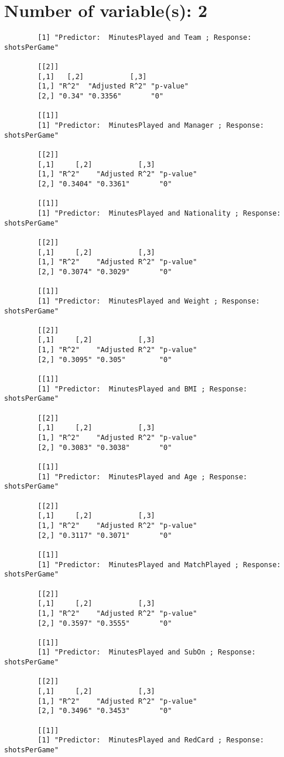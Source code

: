 \documentclass[12pt]{article}
\begin{document}
	\section{Number of variable(s): 2}
	\begin{verbatim}
		[1] "Predictor:  MinutesPlayed and Team ; Response:  shotsPerGame"
		
		[[2]]
		[,1]   [,2]           [,3]     
		[1,] "R^2"  "Adjusted R^2" "p-value"
		[2,] "0.34" "0.3356"       "0"      
		
		[[1]]
		[1] "Predictor:  MinutesPlayed and Manager ; Response:  shotsPerGame"
		
		[[2]]
		[,1]     [,2]           [,3]     
		[1,] "R^2"    "Adjusted R^2" "p-value"
		[2,] "0.3404" "0.3361"       "0"      
		
		[[1]]
		[1] "Predictor:  MinutesPlayed and Nationality ; Response:  shotsPerGame"
		
		[[2]]
		[,1]     [,2]           [,3]     
		[1,] "R^2"    "Adjusted R^2" "p-value"
		[2,] "0.3074" "0.3029"       "0"      
		
		[[1]]
		[1] "Predictor:  MinutesPlayed and Weight ; Response:  shotsPerGame"
		
		[[2]]
		[,1]     [,2]           [,3]     
		[1,] "R^2"    "Adjusted R^2" "p-value"
		[2,] "0.3095" "0.305"        "0"      
		
		[[1]]
		[1] "Predictor:  MinutesPlayed and BMI ; Response:  shotsPerGame"
		
		[[2]]
		[,1]     [,2]           [,3]     
		[1,] "R^2"    "Adjusted R^2" "p-value"
		[2,] "0.3083" "0.3038"       "0"      
		
		[[1]]
		[1] "Predictor:  MinutesPlayed and Age ; Response:  shotsPerGame"
		
		[[2]]
		[,1]     [,2]           [,3]     
		[1,] "R^2"    "Adjusted R^2" "p-value"
		[2,] "0.3117" "0.3071"       "0"      
		
		[[1]]
		[1] "Predictor:  MinutesPlayed and MatchPlayed ; Response:  shotsPerGame"
		
		[[2]]
		[,1]     [,2]           [,3]     
		[1,] "R^2"    "Adjusted R^2" "p-value"
		[2,] "0.3597" "0.3555"       "0"      
		
		[[1]]
		[1] "Predictor:  MinutesPlayed and SubOn ; Response:  shotsPerGame"
		
		[[2]]
		[,1]     [,2]           [,3]     
		[1,] "R^2"    "Adjusted R^2" "p-value"
		[2,] "0.3496" "0.3453"       "0"      
		
		[[1]]
		[1] "Predictor:  MinutesPlayed and RedCard ; Response:  shotsPerGame"
		

\end{verbatim}
\end{document}
